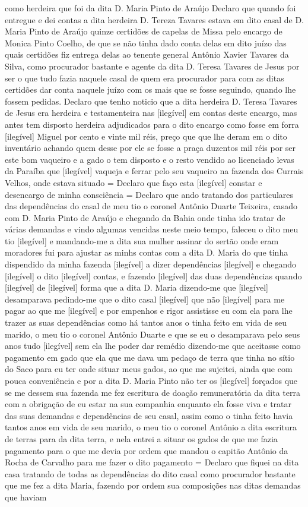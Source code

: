 \begin{refsection}
como herdeira que foi da dita D. Maria Pinto de Araújo Declaro que quando foi entregue e dei contas a dita herdeira D. Tereza Tavares estava em dito casal de D. Maria Pinto de Araújo quinze certidões de capelas de Missa pelo encargo de Monica Pinto Coelho, de que se não tinha dado conta delas em dito juízo das quais certidões fiz entrega delas ao tenente general Antônio Xavier Tavares da Silva, como procurador bastante e agente da dita D. Teresa Tavares de Jesus por ser o que tudo fazia naquele casal de quem era procurador para com as ditas certidões dar conta naquele juízo com os mais que se fosse seguindo, quando lhe fossem pedidas. Declaro que tenho noticio que a dita herdeira D. Teresa Tavares de Jesus era herdeira e testamenteira nas [ilegível] em contas deste encargo, mas antes tem disposto herdeira adjudicados para o dito encargo como fosse em forra [ilegível] Miguel por cento e vinte mil réis, preço que que lhe deram em o dito inventário achando quem desse por ele se fosse a praça duzentos mil réis por ser este bom vaqueiro e a gado o tem disposto e o resto vendido ao licenciado levas da Paraíba que [ilegível] vaqueja e ferrar pelo seu vaqueiro na fazenda dos Currais Velhos, onde estava situado = Declaro que faço esta [ilegível] constar e desencargo de minha consciência = Declaro que ando tratando dos particulares das dependências do casal de meu tio o coronel Antônio Duarte Teixeira, casado com D. Maria Pinto de Araújo e chegando da Bahia onde tinha ido tratar de várias demandas e vindo algumas vencidas neste meio tempo, faleceu o dito meu tio [ilegível] e mandando-me a dita sua mulher assinar do sertão onde eram moradores fui para ajustar as minhs contas com a dita D. Maria do que tinha dispendido da minha fazenda [ilegível] a dizer dependências [ilegível] e chegando [ilegível] o dito [ilegível] contas, e fazendo [ilegível] das duas dependências quando [ilegível] de [ilegível] forma que a dita D. Maria dizendo-me que [ilegível] desamparava pedindo-me que o dito casal [ilegível] que não [ilegível] para me pagar ao que me [ilegível] e por empenhos e rigor assistisse eu com ela para lhe trazer as suas dependências como há tantos anos o tinha feito em vida de seu marido, o meu tio o coronel Antônio Duarte e que se eu o desamparava pelo seus anos tudo [ilegível] sem ela lhe poder dar remédio dizendo-me que aceitasse como pagamento em gado que ela que me dava um pedaço de terra que tinha no sítio do Saco para eu ter onde situar meus gados, ao que me sujeitei, ainda que com pouca conveniência e por a dita D. Maria Pinto não ter os [ilegível] forçados que se me dessem sua fazenda me fez escritura de doação remuneratória da dita terra com a obrigação de eu estar na sua companhia enquanto ela fosse viva e tratar das suas demandas e dependências de seu casal, assim como o tinha feito havia tantos anos em vida de seu marido, o meu tio o coronel Antônio a dita escritura de terras para da dita terra, e nela entrei a situar os gados de que me fazia pagamento para o que me devia por ordem que mandou o capitão Antônio da Rocha de Carvalho para me fazer o dito pagamento = Declaro que fiquei na dita casa tratando de todas as dependências do dito casal como procurador bastante que me fez a dita Maria, fazendo por ordem sua composições nas ditas demandas que haviam 
\end{refsection}
